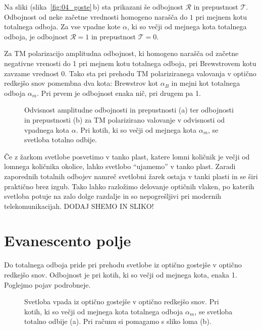 Na sliki (slika~\ref{fig:04_goste}\,b) sta prikazani še odbojnost $\mathcal{R}$ 
in prepustnost $\mathcal{T}$. Odbojnost od neke začetne vrednosti homogeno
narašča do $1$ pri mejnem kotu totalnega odboja. Za vse vpadne kote $\alpha$, ki
so večji od mejnega kota totalnega odboja, je odbojnost $\mathcal{R} = 1$ in 
prepustnost $\mathcal{T} = 0$.

Za TM polarizacijo amplitudna odbojnost, ki homogeno
narašča od začetne negativne vrenosti do 1 pri mejnem
kotu totalnega odboja, pri Brewstrovem kotu zavzame vrednost 0. 
Tako sta pri prehodu TM polariziranega valovanja v optično redkejšo
snov pomembna dva kota: Brewstrov kot $\alpha_B$ in mejni kot totalnega odboja $\alpha_m$.
Pri prvem je odbojnost enaka nič, pri drugem pa 1. 
\begin{figure}[ht]
\centering
\def\svgwidth{140truemm} 

\caption{Odvisnost amplitudne odbojnosti in prepustnosti (a) ter odbojnosti in 
prepustnosti (b) za TM polarizirano valovanje v odvisnosti od vpadnega kota $\alpha$. 
Pri kotih, ki so večji od mejnega kota $\alpha_m$, se svetloba totalno odbije.}
\label{fig:04_gostm}
\end{figure}

\begin{remark}
Če z žarkom svetlobe posvetimo v tanko plast, katere lomni količnik je večji od 
lomnega količnika okolice, lahko svetlobo ``ujamemo'' v tanko plast. Zaradi
zaporednih totalnih odbojev namreč svetlobni žarek ostaja v tanki plasti in se 
širi praktično brez izgub. Tako lahko razložimo delovanje optičnih vlaken, 
po katerih svetloba potuje na zalo dolge razdalje in so nepogrešljivi
pri modernih telekomunikacijah. DODAJ SHEMO IN SLIKO!
\end{remark}

\section{Evanescento polje}
Do totalnega odboja pride pri prehodu svetlobe iz optično gostejše 
v optično redkejšo snov. Odbojnost je pri kotih, ki so večji od mejnega kota,
enaka 1. Poglejmo pojav podrobneje.
\begin{figure}[ht]
\centering
\def\svgwidth{140truemm} 

\caption{Svetloba vpada iz optično gostejše v optično redkejšo snov. Pri kotih,
ki so večji od mejnega kota totalnega odboja $\alpha_m$, se svetloba totalno odbije (a). Pri računu
si pomagamo s sliko loma (b).}
\label{fig:04_totalni}
\end{figure}

